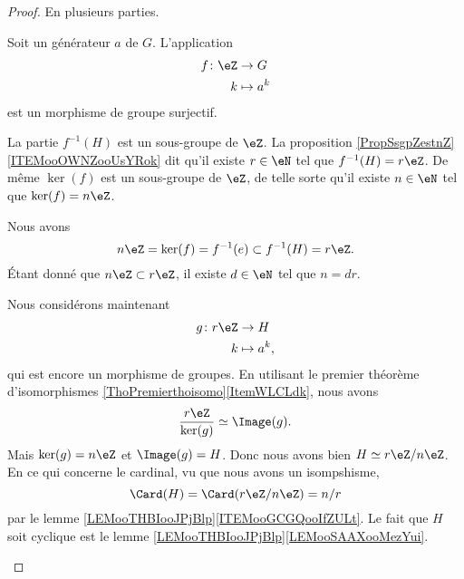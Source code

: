 \begin{proof}
    En plusieurs parties.
    \begin{subproof}
        Soit un générateur \( a\) de \( G\). L'application 
        \begin{equation}
            \begin{aligned}
                f\colon \eZ&\to G \\
                k&\mapsto a^k 
            \end{aligned}
        \end{equation}
        est un morphisme de groupe surjectif.

        La partie \( f^{-1}(H)\) est un sous-groupe de \( \eZ\). La proposition \ref{PropSsgpZestnZ}\ref{ITEMooOWNZooUsYRok} dit qu'il existe \( r\in \eN\) tel que \( f^{-1}(H)=r\eZ\). De même \( \ker(f)\) est un sous-groupe de \( \eZ\), de telle sorte qu'il existe \( n\in \eN\) tel que \( \ker(f)=n\eZ\).

        Nous avons
        \begin{equation}
            n\eZ=\ker(f)=f^{-1}(e)\subset f^{-1}(H)=r\eZ.
        \end{equation}
        Étant donné que \( n\eZ\subset r\eZ\), il existe \( d\in \eN\) tel que \( n=dr\).

        Nous considérons maintenant 
        \begin{equation}
            \begin{aligned}
                g\colon r\eZ&\to H \\
                k&\mapsto a^k,
            \end{aligned}
        \end{equation}
        qui est encore un morphisme de groupes. En utilisant le premier théorème d'isomorphismes \ref{ThoPremierthoisomo}\ref{ItemWLCLdk}, nous avons
        \begin{equation}
            \frac{ r\eZ }{ \ker(g) }\simeq\Image(g).
        \end{equation}
        Mais \( \ker(g)=n\eZ\) et \( \Image(g)=H\). Donc nous avons bien \( H\simeq r\eZ/n\eZ\).
        En ce qui concerne le cardinal, vu que nous avons un isompshisme,
        \begin{equation}
            \Card(H)=\Card(r\eZ/n\eZ)=n/r
        \end{equation}
        par le lemme \ref{LEMooTHBIooJPjBlp}\ref{ITEMooGCGQooIfZULt}.
        Le fait que \( H\) soit cyclique est le lemme \ref{LEMooTHBIooJPjBlp}\ref{LEMooSAAXooMezYui}.
    \end{subproof}
\end{proof}

